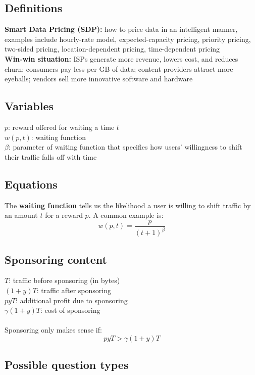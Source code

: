 \documentclass{article}
\begin{document}
\subsection{Definitions}

\textbf{Smart Data Pricing (SDP):} how to price data in an intelligent manner, examples include hourly-rate model, expected-capacity pricing, priority pricing, two-sided pricing, location-dependent pricing, time-dependent pricing \\
\textbf{Win-win situation:} ISPs generate more revenue, lowers cost, and reduces churn; consumers pay less per GB of data; content providers attract more eyeballs; vendors sell more innovative software and hardware

\subsection{Variables}

$p$: reward offered for waiting a time $t$ \\
$w(p,t)$: waiting function \\
$\beta$: parameter of waiting function that specifies how users' willingness to shift their traffic falls off with time

\subsection{Equations}
 
The \textbf{waiting function} tells us the likelihood a user is willing to shift traffic by an amount $t$ for a reward $p$. A common example is:
$$ w(p,t) = \frac{p}{(t+1)^\beta} $$

\subsection{Sponsoring content}

$T$: traffic before sponsoring (in bytes) \\
$(1+y)T$: traffic after sponsoring \\
$pyT$: additional profit due to sponsoring \\
$\gamma(1+y)T$: cost of sponsoring \\
\\
Sponsoring only makes sense if:
$$ pyT > \gamma(1+y)T $$

\subsection{Possible question types}
\end{document}
